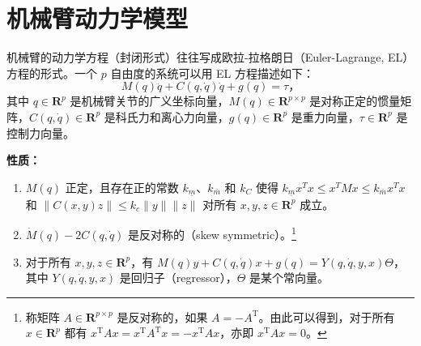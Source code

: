 \section{机械臂动力学模型}\label{6Aref}

机械臂的动力学方程（封闭形式）往往写成欧拉-拉格朗日（Euler-Lagrange, EL）方程的形式。一个 $p$ 自由度的系统可以用 EL 方程描述如下：
\begin{equation} \label{robotic_model}
    M(q) \ddot{q} + C(q, \dot{q}) \dot{q} + g(q) = \tau \text{，}
\end{equation}
其中 $q \in \mathbf{R}^p$ 是机械臂关节的广义坐标向量，$M(q) \in \mathbf{R}^{p \times p}$ 是对称正定的惯量矩阵，$C(q, \dot{q}) \in \mathbf{R}^p$ 是科氏力和离心力向量，$g(q)\in \mathbf{R}^p$ 是重力向量，$\tau \in \mathbf{R}^p$ 是控制力向量。

\noindent\textbf{性质：}
\begin{enumerate}
    \item $M(q)$ 正定，且存在正的常数 $k_{\underline{m}}$、$k_{\overline{m}}$ 和 $k_C$ 使得 $k_{\underline{m}} x^T x \leq x^T M x \leq k_{\overline{m}} x^T x$ 和 $\| C (x, y) z \| \leq k_c \| y \| \| z \|$ 对所有 $x, y , z \in \mathbf{R}^p$ 成立。
    \item $\dot{M} (q) - 2 C (q, \dot{q})$ 是反对称的（skew symmetric）。\footnote{称矩阵 $A \in \mathbf{R}^{p \times p}$ 是反对称的，如果 $A = - A^\mathrm{T}$。由此可以得到，对于所有 $x \in \mathbf{R}^p$ 都有 $x^\mathrm{T} A x = x^\mathrm{T} A^\mathrm{T} x = - x^\mathrm{T} A x$，亦即 $x^\mathrm{T} A x = 0$。}
    \item 对于所有 $x, y , z \in \mathbf{R}^p$，有 $M (q) y + C (q, \dot{q}) x + g (q) = Y (q, \dot{q}, y, x) \Theta$，其中 $Y (q, \dot{q}, y, x)$ 是回归子（regressor），$\Theta$ 是某个常向量。
\end{enumerate}
